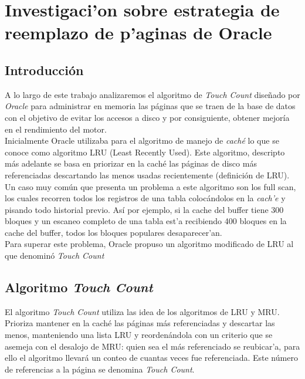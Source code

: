 \documentclass[11pt, a4paper, spanish]{article}
\newenvironment{borde}[1]
{\begin{lrbox}{\fmbox}\begin{minipage}{#1}}
{\end{minipage}\end{lrbox}\fbox{\usebox{\fmbox}}\\[10pt]}
\begin{document}


\newpage 
\section{Investigaci'on sobre estrategia de reemplazo de p'aginas de Oracle}

\subsection{Introducci\'on}

A lo largo de este trabajo analizaremos el algoritmo de \textit{Touch Count} dise\~{n}ado por \textit{Oracle} para administrar en memoria las p\'aginas que se
traen de la base de datos con el objetivo de evitar los accesos a disco y por consiguiente, obtener mejor\'ia en el rendimiento del motor.\\

Inicialmente Oracle utilizaba para el algoritmo de manejo de \textit{cach\'e} lo que se conoce como algoritmo LRU (Least Recently Used). Este algoritmo, 
descripto m\'as adelante se basa en priorizar en la cach\'e las p\'aginas de disco m\'as referenciadas descartando las menos usadas recientemente 
(definici\'on de LRU).\\

Un caso muy com\'un que presenta un problema a este algoritmo son los full scan, los cuales recorren todos los registros de una tabla coloc\'andolos en 
la \textit{cach'e} y pisando todo historial previo. As\'i por ejemplo, si la cache del buffer tiene 300 bloques y un escaneo completo de una 
tabla est'a recibiendo 400 bloques en la cache del buffer, todos los bloques populares desaparecer'an. \\

Para superar este problema, Oracle propuso un algoritmo modificado de LRU al que denomin\'o \textit{Touch Count}
  
\subsection{Algoritmo \textit{Touch Count}}

El algoritmo \textit{Touch Count} utiliza las idea de los algoritmos de LRU y MRU. Prioriza mantener en la cach\'e las p\'aginas m\'as referenciadas y descartar las menos, manteniendo una lista LRU y reorden\'andola con un criterio que se asemeja con el desalojo de MRU: quien sea el m\'as referenciado se reubicar'a, para ello el algoritmo llevar\'a un conteo de cuantas veces fue referenciada. Este n\'umero
de referencias a la p\'agina se denomina \textit{Touch Count}.
\end{document}
